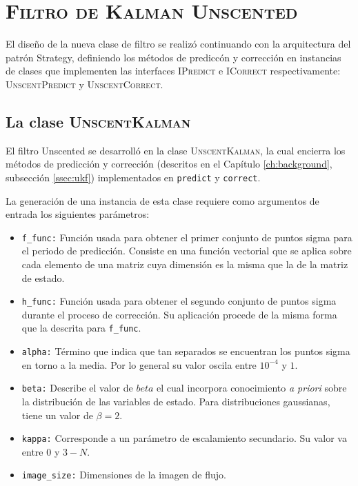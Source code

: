 \section{\textsc{Filtro de Kalman Unscented}}
El dise\~no de la nueva clase de filtro se realiz\'o continuando con la arquitectura del patr\'on Strategy, definiendo los m\'etodos de predicc\'on y correcci\'on en instancias de clases que implementen las interfaces \textsc{IPredict} e \textsc{ICorrect} respectivamente: \textsc{UnscentPredict} y \textsc{UnscentCorrect}.

\subsection{La clase \textsc{UnscentKalman}}

El filtro Unscented se desarroll\'o en la clase \textsc{UnscentKalman}, la cual encierra los m\'etodos de predicci\'on y correcci\'on (descritos en el Cap\'itulo \ref{ch:background}, subsecci\'on \ref{ssec:ukf}) implementados en \texttt{predict} y \texttt{correct}.
\bigskip

La generaci\'on de una instancia de esta clase requiere como argumentos de entrada los siguientes par\'ametros:

\begin{itemize}
\item \texttt{f\_func:} Funci\'on usada para obtener el primer conjunto de puntos sigma para el periodo de predicci\'on. Consiste en una funci\'on vectorial que se aplica sobre cada elemento de una matriz cuya dimensi\'on es la misma que la de la matriz de estado.
\item \texttt{h\_func:} Funci\'on usada para obtener el segundo conjunto de puntos sigma durante el proceso de correcci\'on. Su aplicaci\'on procede de la misma forma que la descrita para \texttt{f\_func}. 
\item \texttt{alpha:} T\'ermino que indica que tan separados se encuentran los puntos sigma en torno a la media. Por lo general su valor oscila entre $10^{-4}$ y $1$. 
\item \texttt{beta:} Describe el valor de $beta$ el cual incorpora conocimiento \textit{a priori} sobre la distribuci\'on de las variables de estado. Para distribuciones gaussianas, tiene un valor de $\beta=2$. 
\item \texttt{kappa:} Corresponde a un par\'ametro de escalamiento secundario. Su valor va entre $0$ y $3-N$.
\item \texttt{image\_size:} Dimensiones de la imagen de flujo.
\end{itemize}

